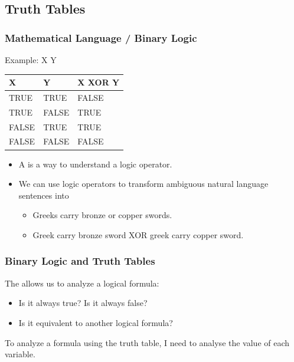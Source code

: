 \documentclass{beamer}
\begin{document}
\subsection{Truth Tables}
\begin{frame}
  \frametitle{Mathematical Language / Binary Logic}

  Example: X  Y

  \bigskip

  \begin{tabular}{ll|l}
    X & Y & X XOR Y\\
    \hline
    TRUE & TRUE & FALSE\\
    TRUE & FALSE & TRUE\\
    FALSE & TRUE & TRUE\\
    FALSE & FALSE & FALSE\\
  \end{tabular}

  \bigskip

  \begin{itemize}
  \item A  is a way to understand a logic
    operator.
  \item We can use logic operators to transform \alert{ambiguous natural
    language sentences} into 
    \begin{itemize}
    \item Greeks carry bronze or copper swords.
    \item Greek carry bronze sword XOR greek carry copper sword.
    \end{itemize}
  \end{itemize}
\end{frame}

\begin{frame}
  \frametitle{Binary Logic and Truth Tables}

  The  allows us to analyze a logical formula:

  \bigskip
  
  \begin{itemize}
  \item Is it always true? Is it always false?
  \item Is it equivalent to another logical formula?
  \end{itemize}

  To analyze a formula using the truth table, I need to analyse the
  value of each variable.
\end{frame}
\end{document}
